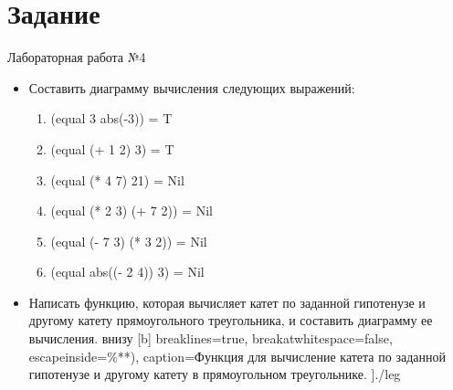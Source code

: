 \newpage
\section*{Задание}
\Large{Лабораторная работа №4}

\begin{itemize}
	\item Составить диаграмму вычисления следующих выражений:
		\begin{enumerate}
			\item (equal 3 abs(-3)) = T
			\item (equal (+ 1 2) 3) = T
			\item (equal (* 4 7) 21) = Nil
			\item (equal (* 2 3) (+ 7 2)) = Nil
			\item (equal (- 7 3) (* 3 2)) = Nil
			\item (equal abs((- 2 4)) 3) = Nil
		\end{enumerate}
	\item Написать функцию, которая вычисляет катет по заданной гипотенузе и другому катету прямоугольного треугольника, и составить диаграмму ее вычисления.
		 внизу [b] 
		breaklines=true,           %
		breakatwhitespace=false, %
		escapeinside={\%*}{*)},  %
		caption=Функция для вычисление катета по заданной гипотенузе и другому катету в прямоугольном треугольнике.
		]{./leg}

\end{itemize}
